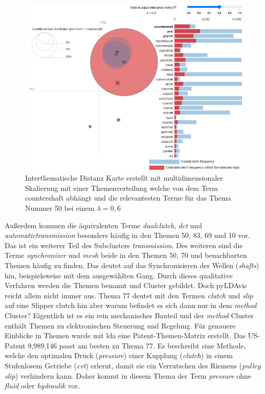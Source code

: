 \begin{landscape}
	\begin{figure}
		\centering
		\includegraphics[width=19.29cm,keepaspectratio=true]{img/clustering_process02.png}
		\caption{
			Interthematische Distanz Karte erstellt mit multidimensionaler Skalierung mit einer Themenverteilung welche von dem Term countershaft abhängt und die relevantesten Terme für das Thema Nummer 50 bei einem $\lambda = 0,6$ 
		}
		\label{fig:clustering_process02}
	\end{figure}
\end{landscape}

 
Außerdem kommen die äquivalenten Terme \emph{dualclutch}, \emph{\gls{dct}} und \emph{automatictransmission} besonders häufig in den Themen 50, 83, 69 und 10 vor. Das ist ein weiterer Teil des Subclusters \emph{transmission}. Des weiteren sind die Terme \emph{synchronizer} und \emph{mesh} beide in den Themen 50, 70 und benachbarten Themen häufig zu finden. Das deutet auf das Synchronisieren der Wellen (\emph{shafts}) hin, beispielsweise mit dem ausgewählten Gang. Durch dieses qualitative Verfahren werden die Themen benannt und Cluster gebildet. Doch \gls{pyLDAvis} reicht allein nicht immer aus. Thema 77 deutet mit den Termen \emph{clutch} und \emph{slip} auf eine Slipper clutch hin aber warum befindet es sich dann nur in dem \emph{method} Cluster? Eigentlich ist es ein rein mechanisches Bauteil und der \emph{method} Cluster enthält Themen zu elektronischen Steuerung und Regelung. Für genauere Einblicke in Themen wurde mit \gls{lda} eine Patent-Themen-Matrix erstellt. Das US-Patent 9,989,146 passt am besten zu Thema 77. Es beschreibt eine Methode, welche den optimalen Druck (\emph{pressure}) einer Kupplung (\emph{clutch}) in einem Stufenlosem Getriebe (\emph{\gls{cvt}}) erlernt, damit sie ein Verrutschen des Riemens (\emph{pulley slip}) verhindern kann. Daher kommt in diesem Thema der Term \emph{pressure} ohne \emph{fluid} oder \emph{hydraulik} vor.
 
